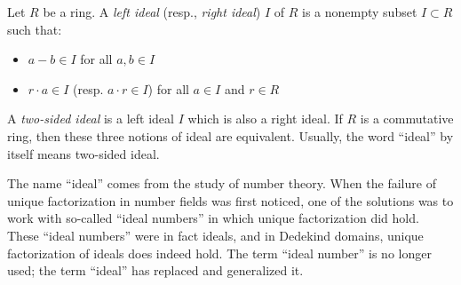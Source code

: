 \documentclass[12pt]{article}
\begin{document}
Let $R$ be a ring. A \emph{left ideal} (resp., \emph{right ideal}) $I$ of $R$ is a nonempty subset $I \subset R$ such that:
\begin{itemize}
\item $a-b \in I$ for all $a,b \in I$
\item $r \cdot a \in I$ (resp. $a \cdot r \in I$) for all $a \in I$ and $r \in R$
\end{itemize}
A \emph{two-sided ideal} is a left ideal $I$ which is also a right ideal. If $R$ is a commutative ring, then these three notions of ideal are equivalent. Usually, the word ``ideal'' by itself means two-sided ideal.

The name ``ideal'' comes from the study of number theory.  When the failure of unique factorization in number fields was first noticed, one of the solutions was to work with so-called ``ideal numbers'' in which unique factorization did hold.  These ``ideal numbers'' were in fact ideals, and in Dedekind domains, unique factorization of ideals does indeed hold.  The term ``ideal number'' is no longer used; the term ``ideal'' has replaced and generalized it.
\end{document}
